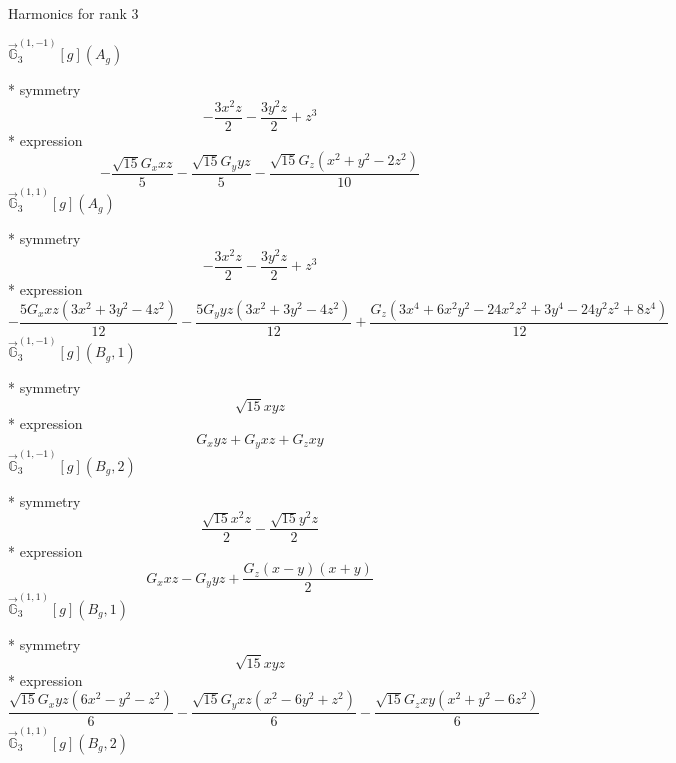\documentclass[fleqn,8pt]{jsarticle}
\begin{document}
\noindent * Harmonics for rank 3

\noindent\quad $\vec{\mathbb{G}}_{3}^{(1,-1)}[g](A_{g})$

\noindent\quad ** symmetry
\begin{dmath*}
- \frac{3 x^{2} z}{2} - \frac{3 y^{2} z}{2} + z^{3}
\end{dmath*}
\noindent\quad ** expression
\begin{dmath*}
- \frac{\sqrt{15} G_{x} x z}{5} - \frac{\sqrt{15} G_{y} y z}{5} - \frac{\sqrt{15} G_{z} \left(x^{2} + y^{2} - 2 z^{2}\right)}{10}
\end{dmath*}
\noindent\quad $\vec{\mathbb{G}}_{3}^{(1,1)}[g](A_{g})$

\noindent\quad ** symmetry
\begin{dmath*}
- \frac{3 x^{2} z}{2} - \frac{3 y^{2} z}{2} + z^{3}
\end{dmath*}
\noindent\quad ** expression
\begin{dmath*}
- \frac{5 G_{x} x z \left(3 x^{2} + 3 y^{2} - 4 z^{2}\right)}{12} - \frac{5 G_{y} y z \left(3 x^{2} + 3 y^{2} - 4 z^{2}\right)}{12} + \frac{G_{z} \left(3 x^{4} + 6 x^{2} y^{2} - 24 x^{2} z^{2} + 3 y^{4} - 24 y^{2} z^{2} + 8 z^{4}\right)}{12}
\end{dmath*}
\noindent\quad $\vec{\mathbb{G}}_{3}^{(1,-1)}[g](B_{g},1)$

\noindent\quad ** symmetry
\begin{dmath*}
\sqrt{15} x y z
\end{dmath*}
\noindent\quad ** expression
\begin{dmath*}
G_{x} y z + G_{y} x z + G_{z} x y
\end{dmath*}
\noindent\quad $\vec{\mathbb{G}}_{3}^{(1,-1)}[g](B_{g},2)$

\noindent\quad ** symmetry
\begin{dmath*}
\frac{\sqrt{15} x^{2} z}{2} - \frac{\sqrt{15} y^{2} z}{2}
\end{dmath*}
\noindent\quad ** expression
\begin{dmath*}
G_{x} x z - G_{y} y z + \frac{G_{z} \left(x - y\right) \left(x + y\right)}{2}
\end{dmath*}
\noindent\quad $\vec{\mathbb{G}}_{3}^{(1,1)}[g](B_{g},1)$

\noindent\quad ** symmetry
\begin{dmath*}
\sqrt{15} x y z
\end{dmath*}
\noindent\quad ** expression
\begin{dmath*}
\frac{\sqrt{15} G_{x} y z \left(6 x^{2} - y^{2} - z^{2}\right)}{6} - \frac{\sqrt{15} G_{y} x z \left(x^{2} - 6 y^{2} + z^{2}\right)}{6} - \frac{\sqrt{15} G_{z} x y \left(x^{2} + y^{2} - 6 z^{2}\right)}{6}
\end{dmath*}
\noindent\quad $\vec{\mathbb{G}}_{3}^{(1,1)}[g](B_{g},2)$
\end{document}
